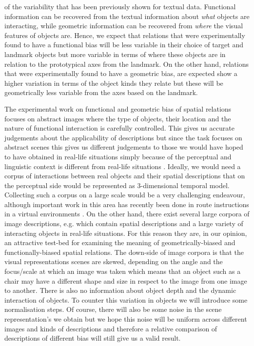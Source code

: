 of the variability that has been previously shown for textual
data. Functional information can be recovered from the textual
information about \emph{what} objects are interacting, while geometric
information can be recovered from \emph{where} the visual features of
objects are. Hence, we expect that relations that were experimentally
found to have a functional bias will be less variable in their choice
of target and landmark objects but more variable in terms of where
these objects are in relation to the prototypical axes from the
landmark. On the other hand, relations that were experimentally found
to have a geometric bias, are expected show a higher variation in
terms of the object kinds they relate but these will be geometrically
less variable from the axes based on the landmark.

The experimental work on functional and geometric bias of spatial
relations focuses on abstract images where the type of objects, their
location and the nature of functional interaction is carefully
controlled. This gives us accurate judgements about the applicability
of descriptions but since the task focuses on abstract scenes this
gives us different judgements to those we would have hoped to have obtained in real-life
situations simply because of the perceptual and linguistic context is
different from real-life situations
\cite{Dobnik:2017ac}. %
Ideally, we would need a corpus of interactions between real objects
and their spatial descriptions that on the perceptual side would be
represented as 3-dimensional temporal model. Collecting such a corpus
on a large scale would be a very challenging endeavour, although
important work in this area has recently been done in route
instructions in a virtual environments \cite{Thomason:2019aa}. On
the other hand, there exist several large corpora of image
descriptions, e.g.  \cite{Krishna:2016aa} which contain spatial
descriptions and a large variety of interacting objects in real-life
situations. For this reason they are, in our opinion, an attractive
test-bed for examining the meaning of geometrically-biased and
functionally-biased spatial relations. The down-side of image
corpora is that the visual representations scenes are skewed, depending
on the angle and the focus/scale at which an image was taken which
means that an object such as a chair may have a different shape and
size in respect to the image from one image to another. There is
also no information about object depth and the dynamic interaction of
objects. To counter this variation in objects we will introduce some
normalisation steps. Of course, there will also be some noise in the
scene representation's we obtain but we hope this noise will be
uniform across different images and kinds of descriptions and
therefore a relative comparison of descriptions of different bias will
still give us a valid result.

